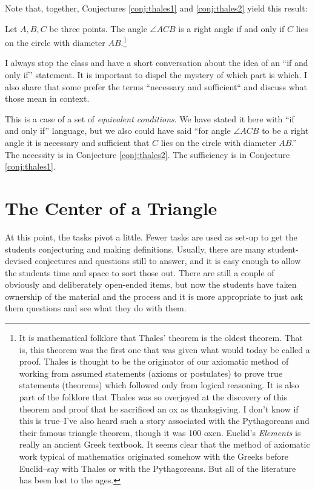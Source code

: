 Note that, together, Conjectures \ref{conj:thales1} and \ref{conj:thales2} yield this result:
\begin{unthm} 
Let $A, B, C$ be three points. 
The angle $\angle ACB$ is a right angle if and only if $C$ lies on the circle with diameter $AB$.\footnote{It is mathematical folklore that Thales' theorem is the oldest theorem. 
That is, this theorem was the first one that was given what would today be called a proof. 
Thales is thought to be the originator of our axiomatic method of working from assumed statements (axioms or postulates) to prove true statements (theorems) which followed only from logical reasoning. 
It is also part of the folklore that Thales was so overjoyed at the discovery of this theorem and proof that he sacrificed an ox as thanksgiving. 
I don't know if this is true--I've also heard such a story associated with the Pythagoreans and their famous triangle theorem, though it was 100 oxen. 
Euclid's \emph{Elements} is really an ancient Greek textbook. 
It seems clear that the method of axiomatic work typical of mathematics originated somehow with the Greeks before Euclid--say with Thales or with the Pythagoreans. But all of the literature has been lost to the ages.}
\end{unthm}

\begin{annotation}
{
\color{blue}
I always stop the class and have a short conversation about 
the idea of an ``if and only if'' statement. It is important to dispel the mystery of which part is which. I also share 
that some prefer the terms ``necessary and sufficient`` and discuss what those mean in context.
}
\end{annotation}


This is a case of a set of \emph{equivalent conditions}. We have stated it
here with ``if and only if'' language, but we also could have said ``for angle $\angle ACB$ to be a right angle it is necessary and sufficient that $C$ lies on the circle with diameter $AB$.'' The necessity is in Conjecture \ref{conj:thales2}. The sufficiency is in Conjecture \ref{conj:thales1}.



\chapter{The Center of a Triangle}

\begin{annotation}
{
\color{blue}
At this point, the tasks pivot a little. Fewer tasks are used as set-up to get the students conjecturing and making definitions. Usually, there are many student-devised conjectures and questions still to answer, and it is easy enough to allow the students time and space to sort those out. There are still a couple of obviously and deliberately open-ended items, but now the students have taken ownership of the material and the process and it is more appropriate to just ask them questions and see what they do with them.
}
\end{annotation}


